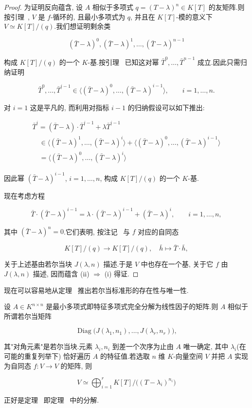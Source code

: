 \begin{proof}
为证明反向蕴含, 设 $A$ 相似于多项式 $q = (T - \lambda)^n \in K[T]$ 的友矩阵.则按引理~, $V$ 是 $f$-循环的, 且最小多项式为 $q$, 并且在 $K[T]$-模的意义下 $V \simeq K[T]/(q)$.我们想证明剩余类

\[
(\bar{T} - \lambda)^0, (\bar{T} - \lambda)^1, \ldots, (\bar{T} - \lambda)^{n - 1}\]

构成 $K[T]/(q)$ 的一个 $K$-基.按引理~ 已知这对幂 $\bar{T}^0, \ldots, \bar{T}^{n - 1}$ 成立.因此只需归纳证明

\[
\bar{T}^0, \ldots, \bar{T}^{i - 1} \in \big\langle (\bar{T} - \lambda)^0, \ldots, (\bar{T} - \lambda)^{i - 1}\big\rangle, \qquad i = 1, \ldots, n\text{.}\]

对 $i = 1$ 这是平凡的, 而利用对指标 $i - 1$ 的归纳假设可以如下推出:

\[
\begin{array}{l}
\bar{T}^i = (\bar{T} - \lambda) \cdot \bar{T}^{i - 1} + \lambda \bar{T}^{i - 1} \\
\quad \in \big\langle (\bar{T} - \lambda)^1, \ldots, (\bar{T} - \lambda)^i\big\rangle + \big\langle (\bar{T} - \lambda)^0, \ldots, (\bar{T} - \lambda)^{i - 1}\big\rangle \\
\quad = \big\langle (\bar{T} - \lambda)^0, \ldots, (\bar{T} - \lambda)^i\big\rangle
\end{array}\]

因此幂 $(\bar{T} - \lambda)^{i - 1}$, $i = 1, \ldots, n$, 构成 $K[T]/(q)$ 的一个 $K$-基.

现在考虑方程

\[
\bar{T} \cdot (\bar{T} - \lambda)^{i - 1} = \lambda \cdot (\bar{T} - \lambda)^{i - 1} + (\bar{T} - \lambda)^i, \qquad i = 1, \ldots, n,\]

其中 $(\bar{T} - \lambda)^n = 0$.它们表明, 按注记~ 与 $f$ 对应的自同态

\[
K[T]/(q) \longrightarrow K[T]/(q), \quad \bar{h} \longmapsto \bar{T} \cdot \bar{h},\]

关于上述基由若尔当块 $J(\lambda, n)$ 描述.于是 $V$ 中也存在一个基, 关于它 $f$ 由 $J(\lambda, n)$ 描述, 因而蕴含 (ii) $\Longrightarrow$ (i) 得证.
\end{proof}

现在可以容易地从定理~ 推出若尔当标准形的存在性与唯一性.

\begin{bigtheorem}[若尔当标准形]\label{bigthm:6.5.15}
设 $A \in K^{n \times n}$ 是最小多项式即特征多项式完全分解为线性因子的矩阵.则 $A$ 相似于所谓若尔当矩阵

\[
\operatorname{Diag}\big(J(\lambda_1, n_1), \ldots, J(\lambda_r, n_r)\big),\]

其"对角元素"是若尔当块.元素 $\lambda_i, n_i$ 到差一个次序为止由 $A$ 唯一确定, 其中 $\lambda_i$(在可能的重复列举下) 恰好遍历 $A$ 的特征值.若选取 $n$ 维 $K$-向量空间 $V$ 并把 $A$ 实现为自同态 $f \colon V \longrightarrow V$ 的矩阵, 则

\[
V \simeq \bigoplus_{i = 1}^{r} K[T]/\big((T - \lambda_i)^{n_i}\big)\]

正好是定理~ 即定理~ 中的分解.
\end{bigtheorem}

